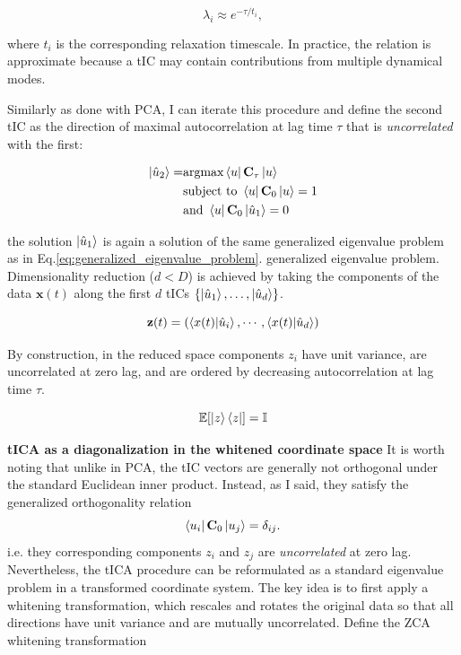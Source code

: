 \begin{equation}
    \label{eq:eigvals_and_timescales}
    \lambda_i \approx e^{-\tau/t_i},
\end{equation}

where $t_i$ is the corresponding relaxation timescale. In practice, the relation is approximate because a tIC may contain contributions from multiple dynamical modes.

Similarly as done with PCA, I can iterate this procedure and define the second tIC as the direction of maximal autocorrelation at lag time $\tau$ that is \textit{uncorrelated} with the first:


\begin{align}
\ket{\hat{u}_2} = &\text{argmax} \bra{u}\mathbf{C}_{\tau}\ket{u} \notag \\
&\text{subject to}  \,\, \bra{u}\mathbf{C}_{0}\ket{u} = 1 \notag \\
&\text{and}   \,\, \bra{u}\mathbf{C}_{0}\ket{\hat{u}_1} = 0
\end{align}

the solution $\ket{\hat{u}_1}$ is again a solution of the same generalized eigenvalue problem as in Eq.\eqref{eq:generalized_eigenvalue_problem}.
generalized eigenvalue problem.
Dimensionality reduction ($d < D$) is achieved by taking the components of the data $\mathbf{x}(t)$ along the first $d$ tICs $\{\ket{\hat{u}_1}, \ldots, \ket{\hat{u}_d}\}$.

\begin{equation}
    \mathbf{z}(t) = (\braket{x(t) | \hat{u}_i}, \cdots, \braket{x(t) | \hat{u}_d})
\end{equation}

By construction, in the reduced space components $z_i$ have unit variance, are uncorrelated at zero lag,  and are ordered by decreasing autocorrelation at lag time $\tau$.

\begin{equation}
    \label{eq:original_tica}
 \mathbb{E}\!\left[\ket{z}\bra{z}\right] = \mathbb{I}
\end{equation}

\vspace{1em}


\noindent \textbf{tICA as a diagonalization in the whitened coordinate space}
It is worth noting that unlike in PCA, the tIC vectors are generally not orthogonal under the standard Euclidean inner product. Instead, as I said, they satisfy the generalized orthogonality relation
$$
\bra{u_i}\mathbf C_0\ket{u_j}=\delta_{ij}.
$$
i.e. they corresponding components $z_i$ and $z_j$ are \textit{uncorrelated} at zero lag. Nevertheless, the tICA procedure can be reformulated as a standard eigenvalue problem in a transformed coordinate system. The key idea is to first apply a whitening transformation, which rescales and rotates the original data so that all directions have unit variance and are mutually uncorrelated. Define the ZCA whitening transformation

